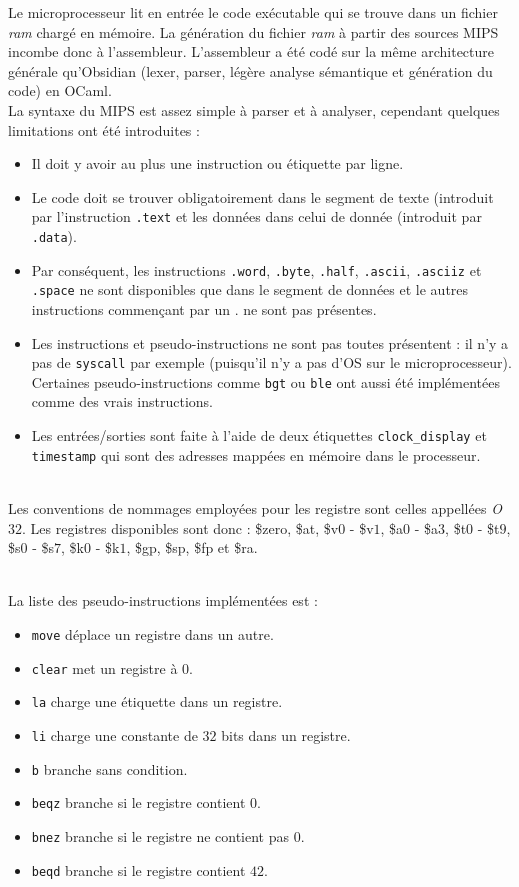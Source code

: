 \documentclass[13pt]{article}
\begin{document}
Le microprocesseur lit en entrée le code exécutable qui se trouve dans un
fichier \emph{ram} chargé en mémoire. La génération du fichier \emph{ram}
à partir des sources MIPS incombe donc à l'assembleur. L'assembleur a été codé
sur la même architecture générale qu'Obsidian (lexer, parser, légère analyse
sémantique et génération du code) en OCaml. \\
La syntaxe du MIPS est assez simple à parser et à analyser, cependant quelques
limitations ont été introduites : 
\begin{itemize}
\item Il doit y avoir au plus une instruction ou étiquette par ligne.
\item Le code doit se trouver obligatoirement dans le segment de texte
  (introduit par l'instruction \texttt{.text} et les données dans celui de
  donnée (introduit par \texttt{.data}). 
\item Par conséquent, les instructions \texttt{.word}, \texttt{.byte},
  \texttt{.half}, \texttt{.ascii}, \texttt{.asciiz} et \texttt{.space} ne sont
  disponibles que dans le segment de données et le autres instructions
  commençant par un \og .\fg{} ne sont pas présentes.
\item Les instructions et pseudo-instructions ne sont pas toutes présentent :
  il n'y a pas de \texttt{syscall} par exemple (puisqu'il n'y a pas d'OS sur le
  microprocesseur). Certaines pseudo-instructions comme \texttt{bgt} ou
  \texttt{ble} ont aussi été implémentées comme des vrais instructions.
\item Les entrées/sorties sont faite à l'aide de deux étiquettes
  \texttt{clock\_display} et \texttt{timestamp} qui sont des adresses mappées en
  mémoire dans le processeur.
\end{itemize}
\text{}\\
Les conventions de nommages employées pour les registre sont celles appellées
\emph{O$32$}. Les registres disponibles sont donc : \$zero, \$at, \$v$0$ -
\$v$1$, \$a$0$ - \$a$3$, \$t$0$ - \$t$9$, \$s$0$ - \$s$7$, \$k$0$ - \$k$1$,
\$gp, \$sp, \$fp et \$ra.

\text{}\\
La liste des pseudo-instructions implémentées est :
\begin{itemize}
\item \texttt{move} déplace un registre dans un autre.
\item \texttt{clear} met un registre à $0$.
\item \texttt{la} charge une étiquette dans un registre.
\item \texttt{li} charge une constante de $32$ bits dans un registre.
\item \texttt{b} branche sans condition.
\item \texttt{beqz} branche si le registre contient $0$.
\item \texttt{bnez} branche si le registre ne contient pas $0$.
\item \texttt{beqd} branche si le registre contient $42$.
\end{itemize}
\end{document}

